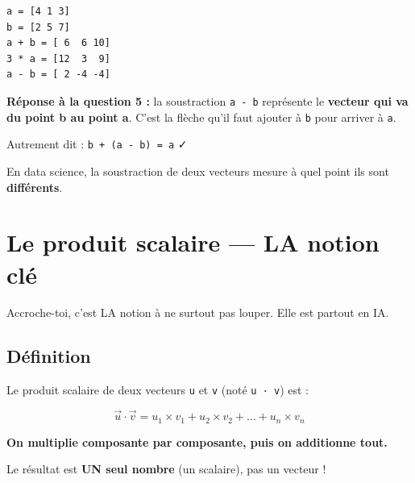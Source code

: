 \documentclass[
  french,
  11pt,
  a4paper,
]{scrbook}
\begin{document}
\begin{tcolorbox}
\begin{verbatim}
a = [4 1 3]
b = [2 5 7]
a + b = [ 6  6 10]
3 * a = [12  3  9]
a - b = [ 2 -4 -4]
\end{verbatim}

\textbf{Réponse à la question 5 :} la soustraction \texttt{a\ -\ b}
représente le \textbf{vecteur qui va du point b au point a}. C'est la
flèche qu'il faut ajouter à \texttt{b} pour arriver à \texttt{a}.

Autrement dit : \texttt{b\ +\ (a\ -\ b)\ =\ a} ✓

En data science, la soustraction de deux vecteurs mesure à quel point
ils sont \textbf{différents}.

\end{tcolorbox}

\chapter{Le produit scalaire --- LA notion
clé}\label{le-produit-scalaire-la-notion-cluxe9}

Accroche-toi, c'est LA notion à ne surtout pas louper. Elle est partout
en IA.

\section{Définition}\label{duxe9finition}

Le produit scalaire de deux vecteurs \texttt{u} et \texttt{v} (noté
\texttt{u\ ·\ v}) est :

\[\vec{u} \cdot \vec{v} = u_1 \times v_1 + u_2 \times v_2 + \dots + u_n \times v_n\]

\textbf{On multiplie composante par composante, puis on additionne
tout.}

\begin{tcolorbox}[enhanced jigsaw, arc=.35mm, bottomrule=.15mm, bottomtitle=1mm, breakable, colback=white, colbacktitle=quarto-callout-warning-color!10!white, colframe=quarto-callout-warning-color-frame, coltitle=black, left=2mm, leftrule=.75mm, opacityback=0, opacitybacktitle=0.6, rightrule=.15mm, title=\textcolor{quarto-callout-warning-color}{\faExclamationTriangle}\hspace{0.5em}{Avertissement}, titlerule=0mm, toprule=.15mm, toptitle=1mm]

Le résultat est \textbf{UN seul nombre} (un scalaire), pas un vecteur !

\end{tcolorbox}
\end{document}
